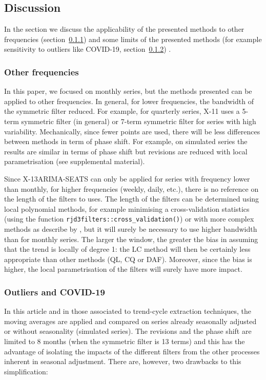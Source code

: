 \documentclass[
]{article}
\newcommand\1{\mathds{1}}
\begin{document}
\subsection{Discussion}\label{discussion}

In the section we discuss the applicability of the presented methods to
other frequencies (section~\ref{sec-other-freq}) and some limits of the
presented methods (for example sensitivity to outliers like COVID-19,
section~\ref{sec-out-covid}) .

\subsubsection{Other frequencies}\label{sec-other-freq}

In this paper, we focused on monthly series, but the methods presented
can be applied to other frequencies. In general, for lower frequencies,
the bandwidth of the symmetric filter reduced. For example, for
quarterly series, X-11 uses a 5-term symmetric filter (in general) or
7-term symmetric filter for series with high variability. Mechanically,
since fewer points are used, there will be less differences between
methods in term of phase shift. For example, on simulated series the
results are similar in terms of phase shift but revisions are reduced
with local parametrisation (see supplemental material).

Since X-13ARIMA-SEATS can only be applied for series with frequency
lower than monthly, for higher frequencies (weekly, daily, etc.), there
is no reference on the length of the filters to uses. The length of the
filters can be determined using local polynomial methods, for example
minimising a cross-validation statistics (using the function
\texttt{rjd3filters::cross\_validation()}) or with more complex methods
as describe by \textcite{Loader1999}, but it will surely be necessary to
use higher bandwidth than for monthly series. The larger the window, the
greater the bias in assuming that the trend is locally of degree 1: the
LC method will then be certainly less appropriate than other methods
(QL, CQ or DAF). Moreover, since the bias is higher, the local
parametrisation of the filters will surely have more impact.

\subsubsection{Outliers and COVID-19}\label{sec-out-covid}

In this article and in those associated to trend-cycle extraction
techniques, the moving averages are applied and compared on series
already seasonally adjusted or without seasonality (simulated series).
The revisions and the phase shift are limited to 8 months (when the
symmetric filter is 13 terms) and this has the advantage of isolating
the impacts of the different filters from the other processes inherent
in seasonal adjustment. There are, however, two drawbacks to this
simplification:
\end{document}
